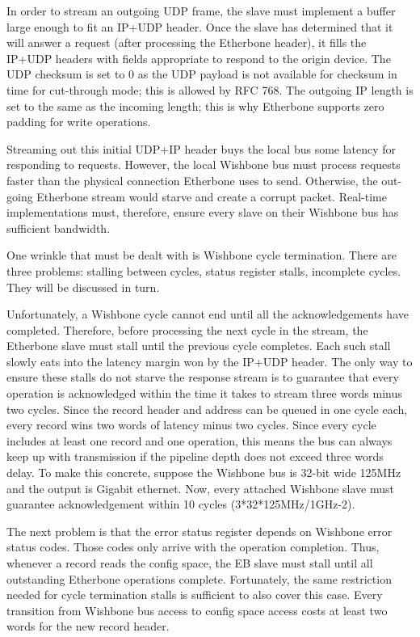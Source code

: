 \documentclass{article}
\begin{document}
In order to stream an outgoing UDP frame,
the slave must implement a buffer large enough to fit an IP+UDP header.
Once the slave has determined that it will answer a request
(after processing the Etherbone header),
it fills the IP+UDP headers with fields appropriate 
to respond to the origin device.
The UDP checksum is set to 0 as the UDP payload is not available for
checksum in time for cut-through mode;
this is allowed by RFC 768.
The outgoing IP length is set to the same as the incoming length;
this is why Etherbone supports zero padding for write operations.

Streaming out this initial UDP+IP header buys the local bus some 
latency for responding to requests.
However, the local Wishbone bus must process requests faster than the
physical connection Etherbone uses to send.
Otherwise, the out-going Etherbone stream would starve and create a 
corrupt packet.
Real-time implementations must, therefore, 
ensure every slave on their Wishbone bus has sufficient bandwidth.

One wrinkle that must be dealt with is Wishbone cycle termination.
There are three problems: 
stalling between cycles, 
status register stalls,
incomplete cycles.
They will be discussed in turn.

Unfortunately, a Wishbone cycle cannot end until all the acknowledgements
have completed.
Therefore,
before processing the next cycle in the stream,
the Etherbone slave must stall until the previous cycle completes.
Each such stall slowly eats into the latency margin 
won by the IP+UDP header.
The only way to ensure these stalls do not starve the response stream
is to guarantee that every operation is acknowledged within the time
it takes to stream three words minus two cycles.
Since the record header and address can be queued in one cycle each,
every record wins two words of latency minus two cycles.
Since every cycle includes at least one record and one operation,
this means the bus can always keep up with transmission if
the pipeline depth does not exceed three words delay.
To make this concrete,
suppose the Wishbone bus is 32-bit wide 125MHz and 
the output is Gigabit ethernet.
Now, every attached Wishbone slave must 
guarantee acknowledgement within 10 cycles
(3*32*125MHz/1GHz-2).

The next problem is that the error status register depends on Wishbone
error status codes.
Those codes only arrive with the operation completion.
Thus, whenever a record reads the config space,
the EB slave must stall until all outstanding Etherbone operations complete.
Fortunately, the same restriction needed for cycle termination stalls
is sufficient to also cover this case.
Every transition from Wishbone bus access to config space access costs
at least two words for the new record header.
\end{document}
